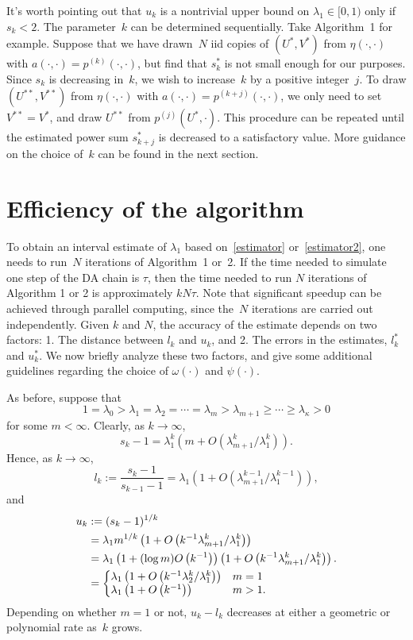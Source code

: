 \documentclass[11pt]{article}
\begin{document}
	It's worth pointing out that $u_k$ is a nontrivial upper bound on $\lambda_1 \in [0,1)$ only if $s_k < 2$. 
	The parameter~$k$ can be determined sequentially.
	Take Algorithm~1 for example. 
	Suppose that we have drawn~$N$ iid copies of $(U^*, V^*)$ from $\eta(\cdot,\cdot)$ with $a(\cdot, \cdot) = p^{(k)}(\cdot,\cdot)$, but find that $s^*_k$ is not small enough for our purposes.
	Since $s_k$ is decreasing in~$k$, we wish to increase~$k$ by a positive integer~$j$.
	To draw $(U^{**}, V^{**})$ from $\eta(\cdot,\cdot)$ with $a(\cdot, \cdot) = p^{(k+j)}(\cdot,\cdot)$, we only need to set $V^{**} = V^*$, and draw $U^{**}$ from $p^{(j)}(U^*, \cdot)$. 
	This procedure can be repeated until the estimated power sum $s^*_{k+j}$ is decreased to a satisfactory value.
	More guidance on the choice of~$k$ can be found in the next section.
	
	
	\section{Efficiency of the algorithm} \label{efficiency}
	
	To obtain an interval estimate of $\lambda_1$ based on~\eqref{estimator} or~\eqref{estimator2}, one needs to run~$N$ iterations of Algorithm~1 or~2. If the time needed to simulate one step of the DA chain is $\tau$, then the time needed to run $N$ iterations of Algorithm 1 or 2 is approximately $kN\tau$. Note that significant speedup can be achieved through parallel computing, since the~$N$ iterations are carried out independently. Given $k$ and $N$, the accuracy of the estimate depends on two factors:
	1. The distance between $l_k$ and $u_k$, and 2. The errors in the estimates, $l^*_k$ and $u^*_k$.  We now briefly analyze these two factors, and give some additional guidelines regarding the choice of $\omega(\cdot)$ and $\psi(\cdot)$.
	
	As before, suppose that
	\[
	1 = \lambda_0 > \lambda_1 = \lambda_2 = \cdots = \lambda_m > \lambda_{m+1} \geq \cdots \geq \lambda_{\kappa} > 0
	\]
	for some $m < \infty$. Clearly, as $k \to \infty$,
	\[
	s_k - 1 = \lambda_1^k \left( m + O \left( \lambda_{m+1}^k/\lambda_1^k \right) \right).
	\]
	Hence, as $k \to \infty$,
	\[
	l_k := \frac{s_k-1}{s_{k-1}-1} = \lambda_1 \left( 1 + O \left( \lambda_{m+1}^{k-1}/\lambda_1^{k-1} \right) \right),
	\]
	and
	\[
	\begin{aligned}
	u_k &:= (s_k-1)^{1/k}\\
	&= \lambda_1 m^{1/k} \left(1 + O\left( k^{-1} \lambda_{m+1}^k/\lambda_1^k \right) \right) \\
	&= \lambda_1 \left( 1 + (\log m) O\left(k^{-1}\right) \right) \left(1 + O\left( k^{-1} \lambda_{m+1}^k/\lambda_1^k \right) \right).\\
	&= \left\{
	\begin{array}{@{}ll@{}}
	\lambda_1 \left(1 + O\left( k^{-1} \lambda_2^k/\lambda_1^k \right) \right)  & m=1 \\
	\lambda_1 \left( 1 + O\left(k^{-1}\right) \right) & m > 1. \,
	\end{array} \right. 
	\end{aligned}
	\]
	Depending on whether $m=1$ or not, $u_k-l_k$ decreases at either a geometric or polynomial rate as~$k$ grows.
	
\end{document}
